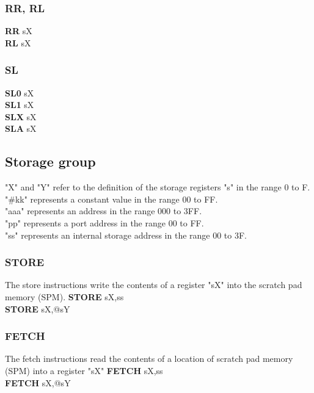 {                        \subsubsection{RR, RL}
                            \textbf{RR}  sX\\
                            \textbf{RL}  sX\\
                        \subsubsection{SL}
                            \textbf{SL0} sX\\
                            \textbf{SL1} sX\\
                            \textbf{SLX} sX\\
                            \textbf{SLA} sX\\
                \subsection{Storage group}
                "X" and "Y" refer to the definition of the storage registers "s" in the range 0 to F.\\
                "\#kk" represents a constant value in the range 00 to FF.\\
                "aaa" represents an address in the range 000 to 3FF.\\
                "pp" represents a port address in the range 00 to FF.\\
                "ss" represents an internal storage address in the range 00 to 3F.\\
                        \subsubsection{STORE}
                        The store instructions write the contents of a register "sX" into the scratch pad memory (SPM).
                            \textbf{STORE} sX,ss\\
                            \textbf{STORE} sX,@sY\\

                        \subsubsection{FETCH}
                        The fetch instructions read the contents of a location of scratch pad memory (SPM) into a register "sX"
                            \textbf{FETCH} sX,ss\\
                            \textbf{FETCH} sX,@sY\\

}
